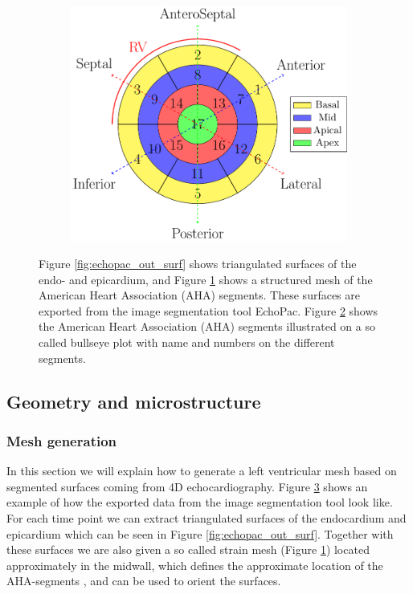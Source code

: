 \begin{figure}[htbp]
\begin{subfigure}[t]{0.3\textwidth}
    \caption{\label{fig:echopac_out_strain_mesh}}
  \end{subfigure}
  \begin{subfigure}[t]{0.38\textwidth}
    \includegraphics[width=\textwidth]{chapters/introduction/figures/bullseye/bullseye.pdf}
    \caption{\label{fig:bullseye_intro}}
  \end{subfigure}
\caption{Figure \ref{fig:echopac_out_surf} shows triangulated surfaces of the
      endo- and epicardium, and Figure
      \ref{fig:echopac_out_strain_mesh} shows a structured mesh of the
      American Heart Association (AHA) segments. These surfaces are
      exported from the image segmentation tool EchoPac. Figure 
      \ref{fig:bullseye_intro} shows the American Heart Association (AHA)
      segments illustrated on a so called bullseye plot with name and
      numbers on the different segments. }
\label{fig:echopac_output}
\end{figure}


\subsection{Geometry and microstructure}


\subsubsection{Mesh generation}
In this section we will explain how to generate a left ventricular
mesh based on segmented surfaces coming from 4D echocardiography.
Figure \ref{fig:echopac_output} shows an example of how the exported data
from the image segmentation tool look like. For each time point we
can extract triangulated surfaces of the endocardium and epicardium
which can be seen in Figure \ref{fig:echopac_out_surf}. Together with
these surfaces we are also given a so called strain mesh (Figure
\ref{fig:echopac_out_strain_mesh}) located approximately in the
midwall, which defines the approximate location of the AHA-segments
\cite{cerqueira2002standardized}, and can be used to orient the surfaces. 



